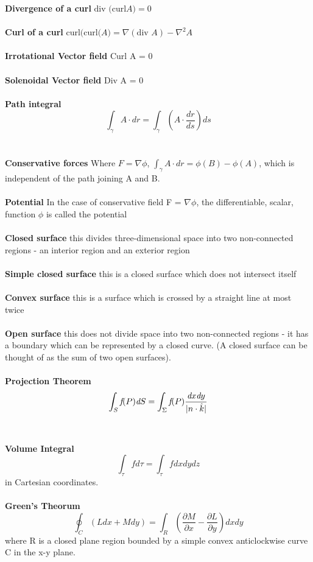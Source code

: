 \documentclass{article}
\begin{document}
\textbf{Divergence of a curl} $ \mbox{div (curl} A) = 0$
\\
\\
\textbf{Curl of a curl} $\mbox{curl(curl(} A) = \nabla (\mbox{div }A) - \nabla^2 A$
\\
\\
\textbf{Irrotational Vector field} Curl A = 0
\\
\\
\textbf{Solenoidal Vector field} Div A = 0
\\
\\
\textbf{Path integral } $$\int_\gamma A \cdot \textit{d}r = \int_\gamma (A \cdot \frac{\textit{d}r}{\textit{d}s}) \textit{d}s$$
\\
\\
\textbf{Conservative forces} Where $F = \nabla \phi$, $\int_\gamma A \cdot \textit{d}r  = \phi(B) - \phi(A)$, which is independent of the path joining A and B.
\\
\\
\textbf{Potential} In the case of conservative field F = $\nabla \phi$, the differentiable, scalar, function $\phi$ is called the potential
\\
\\
\textbf{Closed surface} this divides three-dimensional space into two non-connected regions - an interior region and an exterior region
\\
\\
\textbf{Simple closed surface} this is a closed surface which does not intersect itself
\\
\\
\textbf{Convex surface} this is a surface which is crossed by a straight line at most twice
\\
\\
\textbf{Open surface} this does not divide space into two non-connected regions - it has a boundary which can
be represented by a closed curve. (A closed surface can be thought of as the sum of two open surfaces).
\\
\\
\textbf{Projection Theorem}
$$
\int_S \textit{f}(P) \textit{d}S = \int_\Sigma \textit{f}(P) \frac{\textit{d}x\textit{d}y}{| n \cdot \Hat{k} |} 
$$
\\
\\
\textbf{Volume Integral}
$$
\int_\tau f d \tau = \int_\tau f dxdydz
$$
in Cartesian coordinates.
\\
\\
\textbf{Green's Theorum}
$$
\oint_C (L  dx + M dy) = \int_R (\frac{\partial M}{\partial x} - \frac{\partial L}{\partial y}) dx dy
$$ where R is a closed plane region bounded by a simple convex anticlockwise curve C in the x-y plane.
\end{document}
